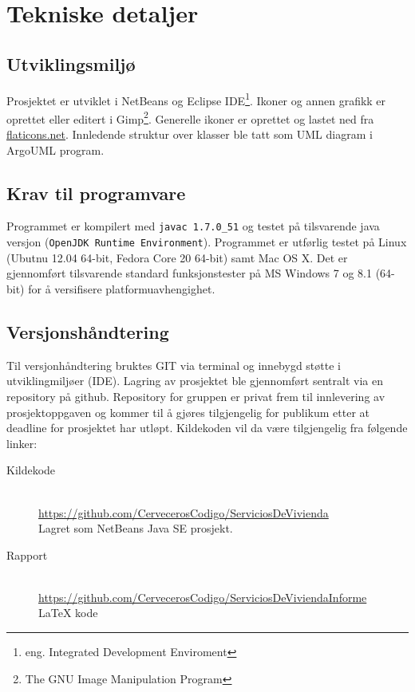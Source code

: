 \section{Tekniske detaljer}

\subsection{Utviklingsmiljø} \label{subssec:utvmiljo}
Prosjektet er utviklet i NetBeans og Eclipse IDE\footnote{eng. Integrated Development Enviroment}. Ikoner og annen grafikk er oprettet eller editert i Gimp\footnote{The GNU Image Manipulation Program}. Generelle ikoner er oprettet og lastet ned fra \href{http://www.flaticons.net}{flaticons.net}. Innledende struktur over klasser ble tatt som UML diagram i ArgoUML program.

\subsection{Krav til programvare}
Programmet er kompilert med \texttt{javac 1.7.0\_51} og testet på tilsvarende java versjon (\texttt{OpenJDK Runtime Environment}). Programmet er utførlig testet på Linux (Ubutnu 12.04 64-bit, Fedora Core 20 64-bit) samt Mac OS X. Det er gjennomført tilsvarende standard funksjonstester på MS Windows 7 og 8.1 (64-bit) for å versifisere platformuavhengighet. 

\subsection{Versjonshåndtering}
Til versjonhåndtering bruktes GIT via terminal og innebygd støtte i utviklingmiljøer (IDE). Lagring av prosjektet ble gjennomført sentralt via en repository på github. Repository for gruppen er privat frem til innlevering av prosjektoppgaven og kommer til å gjøres tilgjengelig for publikum etter at deadline for prosjektet har utløpt. Kildekoden vil da være tilgjengelig fra følgende linker:

\begin{description}
\item[Kildekode]
\hfill \\
\url{https://github.com/CervecerosCodigo/ServiciosDeVivienda}
\\Lagret som NetBeans Java SE prosjekt.

\item[Rapport]
\hfill \\
\url{https://github.com/CervecerosCodigo/ServiciosDeViviendaInforme}
\\ \LaTeX{} kode
\end{description}